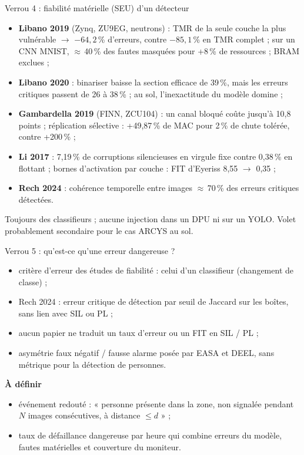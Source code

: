 \documentclass[aspectratio=169,11pt]{beamer}
\newcommand{\prop}{\hfill{\scriptsize\color{acc}\fbox{proposition}}}
\begin{document}
\begin{frame}{Verrou 4 : fiabilité matérielle (SEU) d'un détecteur}
  \small
  \begin{itemize}
    \item \textbf{Libano 2019} (Zynq, ZU9EG, neutrons) : TMR de la seule couche la plus
          vulnérable $\to$ $-64{,}2$\,\% d'erreurs, contre $-85{,}1$\,\% en TMR complet ; sur un CNN
          MNIST, $\approx$\,40\,\% des fautes masquées pour +8\,\% de ressources ; BRAM exclues ;
    \item \textbf{Libano 2020} : binariser baisse la section efficace de 39\,\%, mais les
          erreurs critiques passent de 26 à 38\,\% ; au sol, l'inexactitude du modèle domine ;
    \item \textbf{Gambardella 2019} (FINN, ZCU104) : un canal bloqué coûte jusqu'à 10,8 points ;
          réplication sélective : +49,87\,\% de MAC pour 2\,\% de chute tolérée, contre +200\,\% ;
    \item \textbf{Li 2017} : 7,19\,\% de corruptions silencieuses en virgule fixe contre
          0,38\,\% en flottant ; bornes d'activation par couche : FIT d'Eyeriss 8,55 $\to$ 0,35 ;
    \item \textbf{Rech 2024} : cohérence temporelle entre images $\approx$\,70\,\% des erreurs
          critiques détectées.
  \end{itemize}

  \vspace{0.3em}
  Toujours des classifieurs ; aucune injection dans un DPU ni sur un YOLO.
  {\scriptsize Volet probablement secondaire pour le cas ARCYS au sol.}
\end{frame}

\begin{frame}{Verrou 5 : qu'est-ce qu'une erreur dangereuse ?}
  \begin{itemize}
    \item critère d'erreur des études de fiabilité : celui d'un classifieur (changement de
          classe) ;
    \item Rech 2024 : erreur critique de détection par seuil de Jaccard sur les boîtes,
          sans lien avec SIL ou PL ;
    \item aucun papier ne traduit un taux d'erreur ou un FIT en SIL / PL ;
    \item asymétrie faux négatif / fausse alarme posée par EASA et DEEL, sans métrique pour la
          détection de personnes.
  \end{itemize}

  \vspace{0.5em}
  \textbf{À définir} \prop
  \begin{itemize}
    \item événement redouté : « personne présente dans la zone, non signalée pendant $N$
          images consécutives, à distance $\leq d$ » ;
    \item taux de défaillance dangereuse par heure qui combine erreurs du modèle, fautes
          matérielles et couverture du moniteur.
  \end{itemize}
\end{frame}
\end{document}
